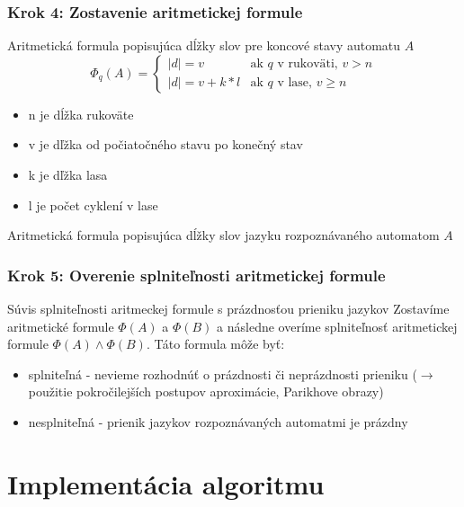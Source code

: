\documentclass[xcolor=dvipsnames]{beamer}
\begin{document}
\begin{frame}
\frametitle{Krok 4: Zostavenie aritmetickej formule}

\begin{block}{Aritmetická formula popisujúca dĺžky slov pre koncové stavy automatu $A$}
$$
\Phi_q(A) =
  \begin{cases}
   |d| = v & \text{ak $q$ v rukoväti, $v > n$} \\
   |d| = v + k*l & \text{ak $q$ v lase, $v \geq n$}
  \end{cases}
$$
\begin{itemize}
\item n je dĺžka rukoväte
\item v je dľžka od počiatočného stavu po konečný stav
\item k je dľžka lasa
\item l je počet cyklení v lase
\end{itemize}
\end{block}

\begin{block}{Aritmetická formula popisujúca dĺžky slov jazyku rozpoznávaného automatom $A$}
\end{block}
\end{frame}

\begin{frame}
\frametitle{Krok 5: Overenie splniteľnosti aritmetickej formule}

\begin{block}{Súvis splniteľnosti aritmeckej formule s prázdnosťou prieniku jazykov}
Zostavíme aritmetické formule $\Phi(A)$ a $\Phi(B)$ a následne overíme splniteľnosť aritmetickej formule $\Phi(A) \wedge \Phi(B)$. Táto formula môže byť: \\
\begin{itemize}
\item splniteľná - nevieme rozhodnúť o prázdnosti či neprázdnosti prieniku ($\rightarrow$ použitie pokročilejších postupov aproximácie, Parikhove obrazy) \\
\item nesplniteľná - prienik jazykov rozpoznávaných automatmi je prázdny
\end{itemize}

\end{block}
\end{frame}

\section{Implementácia algoritmu}
\end{document}
